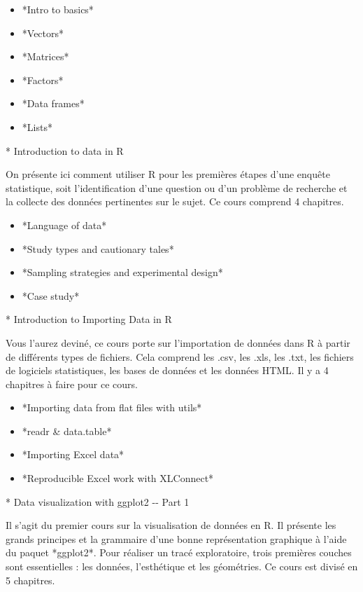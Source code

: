 \documentclass[
  letterpaper,
]{scrbook}
\begin{document}
\begin{itemize}
\item
  *Intro to basics*
\item
  *Vectors*
\item
  *Matrices*
\item
  *Factors*
\item
  *Data frames*
\item
  *Lists*
\end{itemize}

* Introduction to data in R

On présente ici comment utiliser R pour les premières étapes d'une
enquête statistique, soit l'identification d'une question ou d'un
problème de recherche et la collecte des données pertinentes sur le
sujet. Ce cours comprend 4 chapitres.

\begin{itemize}
\item
  *Language of data*
\item
  *Study types and cautionary tales*
\item
  *Sampling strategies and experimental design*
\item
  *Case study*
\end{itemize}

* Introduction to Importing Data in R

Vous l'aurez deviné, ce cours porte sur l'importation de données dans R
à partir de différents types de fichiers. Cela comprend les .csv, les
.xls, les .txt, les fichiers de logiciels statistiques, les bases de
données et les données HTML. Il y a 4 chapitres à faire pour ce cours.

\begin{itemize}
\item
  *Importing data from flat files with utils*
\item
  *readr \& data.table*
\item
  *Importing Excel data*
\item
  *Reproducible Excel work with XLConnect*
\end{itemize}

* Data visualization with ggplot2 -\/- Part 1

Il s'agit du premier cours sur la visualisation de données en R. Il
présente les grands principes et la grammaire d'une bonne représentation
graphique à l'aide du paquet *ggplot2*. Pour réaliser un tracé
exploratoire, trois premières couches sont essentielles : les données,
l'esthétique et les géométries. Ce cours est divisé en 5 chapitres.
\end{document}
